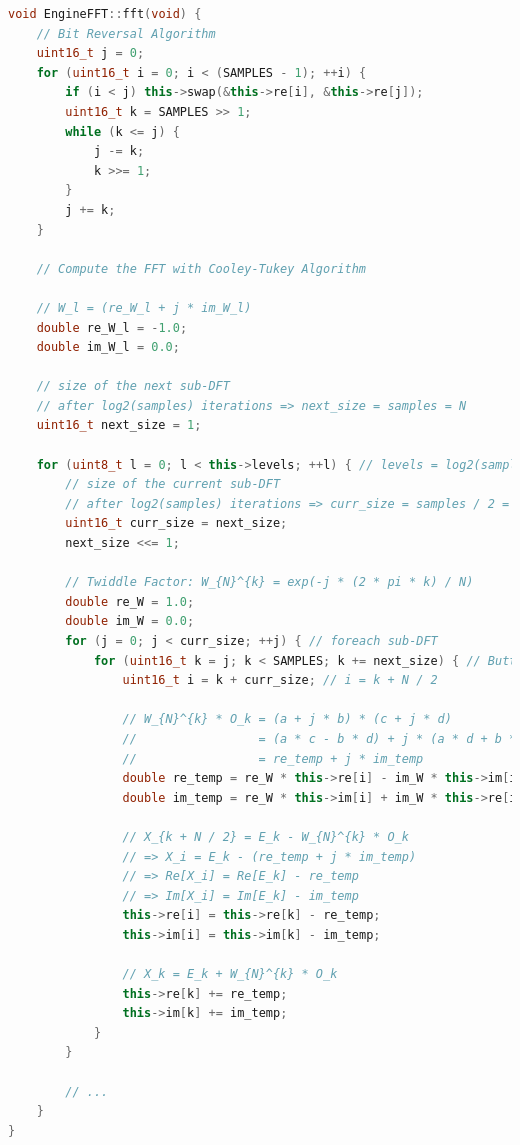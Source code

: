 \documentclass[a4paper,12pt]{report}  %
\begin{document}
\begin{lstlisting}[language=C++, keywords={void, uint16_t, while, for, if, double, this, uint8_t}]
void EngineFFT::fft(void) {
    // Bit Reversal Algorithm
    uint16_t j = 0;
    for (uint16_t i = 0; i < (SAMPLES - 1); ++i) {
        if (i < j) this->swap(&this->re[i], &this->re[j]);
        uint16_t k = SAMPLES >> 1;
        while (k <= j) {
            j -= k;
            k >>= 1;
        }
        j += k;
    }

    // Compute the FFT with Cooley-Tukey Algorithm

    // W_l = (re_W_l + j * im_W_l)
    double re_W_l = -1.0;
    double im_W_l = 0.0;

    // size of the next sub-DFT
    // after log2(samples) iterations => next_size = samples = N
    uint16_t next_size = 1;
    
    for (uint8_t l = 0; l < this->levels; ++l) { // levels = log2(samples)
        // size of the current sub-DFT
        // after log2(samples) iterations => curr_size = samples / 2 = N / 2
        uint16_t curr_size = next_size;
        next_size <<= 1;

        // Twiddle Factor: W_{N}^{k} = exp(-j * (2 * pi * k) / N)
        double re_W = 1.0;
        double im_W = 0.0;
        for (j = 0; j < curr_size; ++j) { // foreach sub-DFT
            for (uint16_t k = j; k < SAMPLES; k += next_size) { // Butterfly Operations
                uint16_t i = k + curr_size; // i = k + N / 2

                // W_{N}^{k} * O_k = (a + j * b) * (c + j * d)
                //                 = (a * c - b * d) + j * (a * d + b * c)
                //                 = re_temp + j * im_temp
                double re_temp = re_W * this->re[i] - im_W * this->im[i];
                double im_temp = re_W * this->im[i] + im_W * this->re[i];
                
                // X_{k + N / 2} = E_k - W_{N}^{k} * O_k
                // => X_i = E_k - (re_temp + j * im_temp)
                // => Re[X_i] = Re[E_k] - re_temp
                // => Im[X_i] = Im[E_k] - im_temp
                this->re[i] = this->re[k] - re_temp;
                this->im[i] = this->im[k] - im_temp;
                
                // X_k = E_k + W_{N}^{k} * O_k
                this->re[k] += re_temp;
                this->im[k] += im_temp;
            }
        }

        // ...
    }
}
\end{lstlisting}
\end{document}
